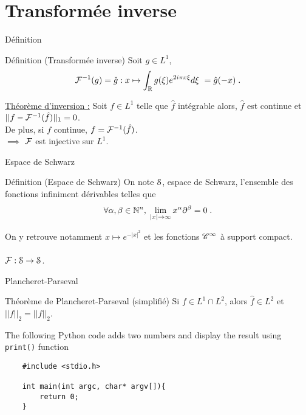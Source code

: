 \documentclass[usenames,dvipsnames,aspectratio=169]{beamer} %
\begin{document}

\section{Transformée inverse}



\begin{frame}{Définition}
   \begin{block}{Définition (Transformée inverse)}
        Soit $g\in L^1$, $$ \fF^{-1}(g) = \check{g} : x\mapsto \int_\R g(\xi) e^{2i\pi x\xi}d\xi \ = \hat g(-x)\;.$$
   \end{block}
   \pause
   \underline{Théorème d'inversion :} Soit $f\in L^1$ telle que $\hat{f}$ intégrable alors, $\hat{f}$ est continue et $|| f- \fF^{-1}(\hat{f})||_1 = 0$.\\ 
   \pause
   De plus, si $f$ continue, $f = \fF^{-1}(\hat{f})$.\\
   $\implies$ $\fF$ est injective sur $L^1$.
    
\end{frame}



\begin{frame}{Espace de Schwarz}
    \begin{block}{Définition (Espace de Schwarz)}
        On note $\mathcal{S}$, espace de Schwarz, l'ensemble des fonctions infiniment dérivables telles que $$\forall \alpha,\beta \in \mathbb{N}^n,\; \lim_{|x|\rightarrow\infty} x^\alpha \partial^\beta =0\;.$$
    \end{block}
    \pause
    On y retrouve notamment $x\mapsto e^{-|x|^2}$ et les fonctions $\mathscr{C}^\infty$ à support compact.\\
    \text{ }\\
    \pause
    $\fF : \mS\ra \mS$.
\end{frame}


\begin{frame}{Plancheret-Parseval}
    
    \begin{block}{Théorème de Plancheret-Parseval (simplifié)}
        Si $f\in L^1\cap L^2$, alors $\hat{f}\in L^2$ et $||f||_2 = ||\hat{f}||_2$.
    \end{block}

\end{frame}


\begin{frame}[fragile]
The following Python code adds two numbers and display the result using \verb|print()| function
\begin{verbatim}
    #include <stdio.h>

    int main(int argc, char* argv[]){
        return 0;
    }
\end{verbatim}
\end{frame}
\end{document}
